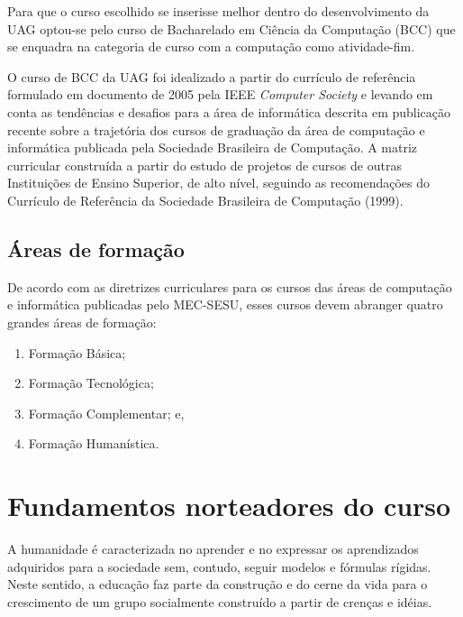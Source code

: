 \documentclass[
	12pt,				%
	openright,			%
  oneside,     %
	a4paper,			%
	english,			%
	french,				%
	spanish,			%
	brazil				%
	]{abntex2}
\begin{document}
Para que o curso escolhido se inserisse melhor dentro do desenvolvimento da UAG
optou-se pelo curso de Bacharelado em Ciência da Computação (BCC) que se
enquadra na categoria de curso com a computação como atividade-fim.

O curso de BCC da UAG foi idealizado a partir do currículo de referência
formulado em documento de 2005 pela IEEE \textit{Computer Society} e levando em conta as
tendências e desafios para a área de informática descrita em publicação recente
sobre a trajetória dos cursos de graduação da área de computação e informática
publicada pela Sociedade Brasileira de Computação. A matriz curricular
construída a partir do estudo de projetos de cursos de outras Instituições de
Ensino Superior, de alto nível, seguindo as recomendações do Currículo de
Referência da Sociedade Brasileira de Computação (1999).
	
\section{Áreas de formação}

De acordo com as diretrizes curriculares para os cursos das áreas de computação
e informática publicadas pelo MEC-SESU, esses cursos devem abranger quatro
grandes áreas de formação:
\begin{enumerate}
  \item Formação Básica;
  \item Formação Tecnológica;
  \item Formação Complementar; e,
  \item Formação Humanística.
\end{enumerate}


%
%


\chapter{Fundamentos norteadores do curso}

A humanidade é caracterizada no aprender e no expressar os aprendizados
adquiridos para a sociedade sem, contudo, seguir modelos e fórmulas rígidas.
Neste sentido, a educação faz parte da construção e do cerne da vida para o
crescimento de um grupo socialmente construído a partir de crenças e idéias.
\end{document}
